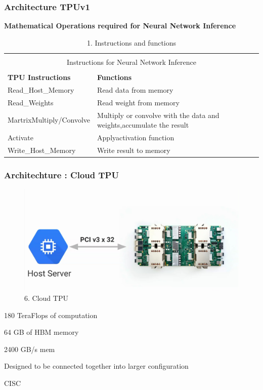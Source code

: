 \documentclass[c]{beamer}
\begin{document}
  \begin{frame}[t]
  \frametitle{Architecture TPUv1}
   \textbf {Mathematical Operations required for Neural Network Inference} \newline
   \begin{table}
  {\centering
\begin{tabular}{ |p{5.5cm}|p{5.5cm}|  }
\hline
\multicolumn {2}{|c|}{}\\
\multicolumn {2}{|c|}{\large Instructions for Neural Network Inference} \\ 
\multicolumn {2}{|c|}{}\\
\hline
\textbf{TPU Instructions} & \textbf{Functions}  \\
\hline
Read\_Host\_Memory & Read data from memory \\
\hline
Read\_Weights & Read weight from memory\\
\hline
MartrixMultiply/Convolve & Multiply or convolve with the data and weights,accumulate the result\\
\hline
Activate & Applyactivation function \\
\hline
Write\_Host\_Memory & Write result to memory \\
\hline
\end{tabular}}
	\caption{1. Instructions and functions}
	 \label{tab:table1}
	\end{table}
  \end{frame}
  \begin{frame} [c]
  \frametitle{Architechture : Cloud TPU}
  \begin{figure}
   \centering
            \includegraphics[scale=0.225]{images/9cloudtpu.png}
            \caption{6. Cloud TPU}
            \label{fig:Cloud TPU}
  \end{figure}
  \begin{itemize}
     {\small \item 180 TeraFlops of computation
\item 64 GB of HBM memory
\item2400 GB/s mem
\item Designed to be connected together into larger configuration
\item CISC}

  \end{itemize}
  \end{frame}
\end{document}
